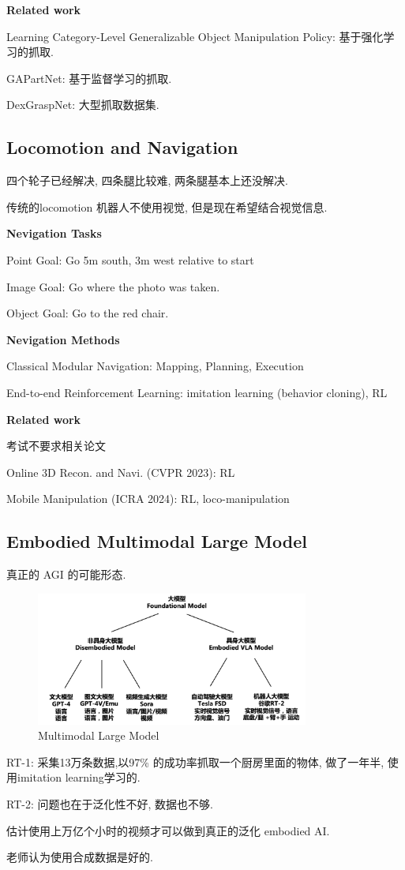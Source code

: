 \textbf{Related work}

Learning Category-Level Generalizable Object Manipulation Policy: 基于强化学习的抓取.

GAPartNet: 基于监督学习的抓取.

DexGraspNet: 大型抓取数据集.

\subsection{Locomotion and Navigation}

四个轮子已经解决, 四条腿比较难, 两条腿基本上还没解决.

传统的locomotion 机器人不使用视觉, 但是现在希望结合视觉信息.

\textbf{Nevigation Tasks}

Point Goal: Go 5m south, 3m west relative to start

Image Goal: Go where the photo was taken.

Object Goal: Go to the red chair.

\textbf{Nevigation Methods}

Classical Modular Navigation: Mapping, Planning, Execution

End-to-end Reinforcement Learning: imitation learning (behavior cloning), RL

\textbf{Related work}

考试不要求相关论文

Online 3D Recon. and Navi. (CVPR 2023): RL

Mobile Manipulation (ICRA 2024): RL, loco-manipulation

\subsection{Embodied Multimodal Large Model}

真正的 AGI 的可能形态.

\begin{figure}[H]
    \centering
    \includegraphics[width=0.8\textwidth]{figures/Embodied_Multimodal_Large_Model.png}
    \caption{Multimodal Large Model}
\end{figure}

RT-1: 采集13万条数据,以97\% 的成功率抓取一个厨房里面的物体, 做了一年半, 使用imitation learning学习的.

RT-2: 问题也在于泛化性不好, 数据也不够.

估计使用上万亿个小时的视频才可以做到真正的泛化 embodied AI.

老师认为使用合成数据是好的.
